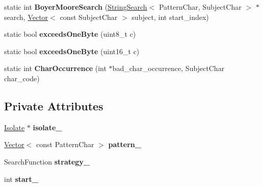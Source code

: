 \begin{DoxyCompactItemize}
\item 
static int {\bfseries Boyer\+Moore\+Search} (\hyperlink{classv8_1_1internal_1_1_string_search}{String\+Search}$<$ Pattern\+Char, Subject\+Char $>$ $\ast$search, \hyperlink{classv8_1_1internal_1_1_vector}{Vector}$<$ const Subject\+Char $>$ subject, int start\+\_\+index)\hypertarget{classv8_1_1internal_1_1_string_search_a720009fbb9472e1897bf68f0ea035be7}{}\label{classv8_1_1internal_1_1_string_search_a720009fbb9472e1897bf68f0ea035be7}

\item 
static bool {\bfseries exceeds\+One\+Byte} (uint8\+\_\+t c)\hypertarget{classv8_1_1internal_1_1_string_search_aab09232e863255da3bf2ae1c8b89cfc9}{}\label{classv8_1_1internal_1_1_string_search_aab09232e863255da3bf2ae1c8b89cfc9}

\item 
static bool {\bfseries exceeds\+One\+Byte} (uint16\+\_\+t c)\hypertarget{classv8_1_1internal_1_1_string_search_a345727e24ab6228477cfd5227e985f5b}{}\label{classv8_1_1internal_1_1_string_search_a345727e24ab6228477cfd5227e985f5b}

\item 
static int {\bfseries Char\+Occurrence} (int $\ast$bad\+\_\+char\+\_\+occurrence, Subject\+Char char\+\_\+code)\hypertarget{classv8_1_1internal_1_1_string_search_ad5124fe166cfbebe14cf49ebc58afd1b}{}\label{classv8_1_1internal_1_1_string_search_ad5124fe166cfbebe14cf49ebc58afd1b}

\end{DoxyCompactItemize}
\subsection*{Private Attributes}
\begin{DoxyCompactItemize}
\item 
\hyperlink{classv8_1_1internal_1_1_isolate}{Isolate} $\ast$ {\bfseries isolate\+\_\+}\hypertarget{classv8_1_1internal_1_1_string_search_a9a892d76b3af06afb881ceea61407038}{}\label{classv8_1_1internal_1_1_string_search_a9a892d76b3af06afb881ceea61407038}

\item 
\hyperlink{classv8_1_1internal_1_1_vector}{Vector}$<$ const Pattern\+Char $>$ {\bfseries pattern\+\_\+}\hypertarget{classv8_1_1internal_1_1_string_search_ae669e4bc6bbfc52674674c907690ecfd}{}\label{classv8_1_1internal_1_1_string_search_ae669e4bc6bbfc52674674c907690ecfd}

\item 
Search\+Function {\bfseries strategy\+\_\+}\hypertarget{classv8_1_1internal_1_1_string_search_a1f2db20cc4af8c94842a0592c3e53c6f}{}\label{classv8_1_1internal_1_1_string_search_a1f2db20cc4af8c94842a0592c3e53c6f}

\item 
int {\bfseries start\+\_\+}\hypertarget{classv8_1_1internal_1_1_string_search_a947ddc556bf33d80b412ac0c07999f65}{}\label{classv8_1_1internal_1_1_string_search_a947ddc556bf33d80b412ac0c07999f65}

\end{DoxyCompactItemize}
